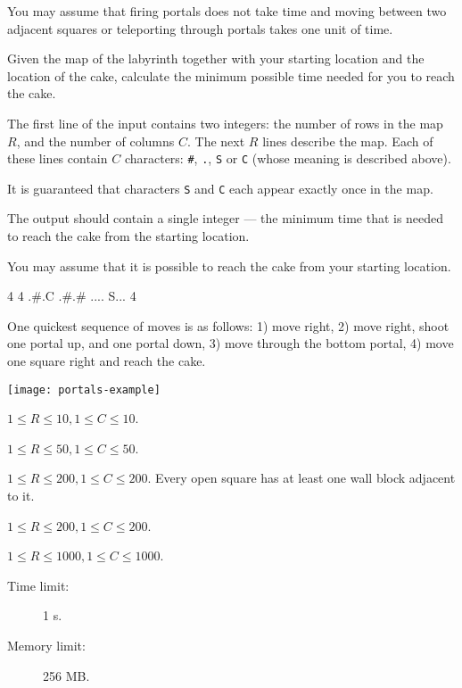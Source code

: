 \documentclass{boi2014}
\newcommand{\constant}[1]{{\tt #1}}
\begin{document}
    You may assume that firing portals does not take time and moving between two
    adjacent squares or teleporting through portals takes one unit of time.

    \Task
    Given the map of the labyrinth together with your starting location
    and the location of the cake, calculate the minimum possible time needed
    for you to reach the cake.

    \Input
    The first line of the input contains two integers: the number of rows
    in the map $R$, and the number of columns $C$. The next $R$ lines describe
    the map. Each of these lines contain $C$ characters: \constant{\#},
    \constant{.}, \constant{S} or \constant{C} (whose meaning is described
    above).

    It is guaranteed that characters \constant{S} and \constant{C} each appear
    exactly once in the map.

    \Output
    The output should contain a single integer --- the minimum time that
    is needed to reach the cake from the starting location.

    You may assume that it is possible to reach the cake from your
    starting location.

    \Example
    \example
    {
        4 4\newline
        .\#.C\newline
        .\#.\#\newline
        ....\newline
        S...
    }
    {
        4
    }
    {
        One quickest sequence of moves is as follows: 1) move right, 2) move
        right, shoot one portal up, and one portal down, 3) move through the
        bottom portal, 4) move one square right and reach the cake.

        \begin{center}
            \texttt{[image: portals-example]}
        \end{center}
    }

    \Scoring

    \begin{description}[leftmargin=0pt]
        \item[Subtask 1 (? points):] $1 \le R \le 10, 1 \le C \le 10$.
        \item[Subtask 2 (? points):] $1 \le R \le 50, 1 \le C \le 50$.
        \item[Subtask 3 (? points):] $1 \le R \le 200, 1 \le C \le 200$.
        Every open square has at least one wall block adjacent to it.
        \item[Subtask 4 (? points):] $1 \le R \le 200, 1 \le C \le 200$.
        \item[Subtask 5 (? points):] $1 \le R \le 1000, 1 \le C \le 1000$.
    \end{description}

    \Constraints

    \begin{description}
        \item[Time limit:] 1 s.
        \item[Memory limit:] 256 MB.
    \end{description}
\end{document}
